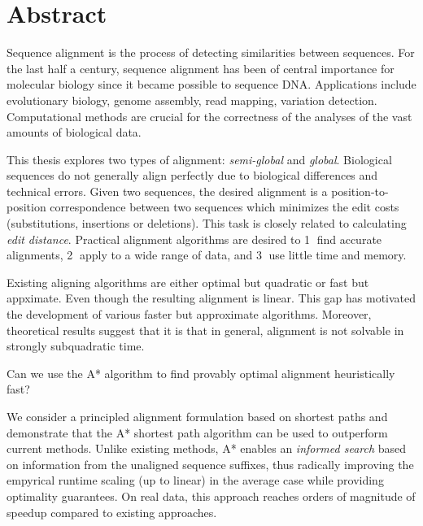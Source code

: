 \begingroup
\let\clearpage\relax
\let\cleardoublepage\relax
\let\cleardoublepage\relax

\chapter*{Abstract}

Sequence alignment is the process of detecting similarities between sequences.
For the last half a century, sequence alignment has been of central importance
for molecular biology since it became possible to sequence DNA. Applications
include evolutionary biology, genome assembly, read mapping, variation
detection. Computational methods are crucial for the correctness of the analyses
of the vast amounts of biological data.

This thesis explores two types of alignment: \emph{semi-global} and
\emph{global}. Biological sequences do not generally align perfectly due to
biological differences and technical errors. Given two sequences, the desired
alignment is a position-to-position correspondence between two sequences which
minimizes the edit costs (substitutions, insertions or deletions). This task is
closely related to calculating \emph{edit distance}. Practical alignment
algorithms are desired to \textcircled{1} find accurate alignments,
\textcircled{2} apply to a wide range of data, and \textcircled{3} use little
time and memory.

Existing aligning algorithms are either optimal but quadratic or fast but
appximate. Even though the resulting alignment is linear. This gap has motivated
the development of various faster but approximate algorithms. Moreover,
theoretical results suggest that it is that in general, alignment is not
solvable in strongly subquadratic time.

Can we use the A* algorithm to find provably optimal alignment heuristically
fast?

We consider a principled alignment formulation based on shortest paths and
demonstrate that the A* shortest path algorithm can be used to outperform
current methods. Unlike existing methods, A* enables an \emph{informed search}
based on information from the unaligned sequence suffixes, thus radically
improving the empyrical runtime scaling (up to linear) in the average case while
providing optimality guarantees. On real data, this approach reaches orders of
magnitude of speedup compared to existing approaches.

